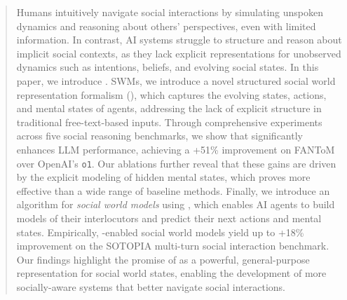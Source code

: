 \begin{abstract}
Humans intuitively navigate social interactions by simulating unspoken dynamics and reasoning about others' perspectives, even with limited information. 
In contrast, AI systems struggle to structure and reason about implicit social contexts, as they lack explicit representations for unobserved dynamics such as intentions, beliefs, and evolving social states.
In this paper, we introduce .
 SWMs, we introduce a novel structured social world representation formalism (\protocolname), which captures the evolving states, actions, and mental states of agents, addressing the lack of explicit structure in traditional free-text-based inputs.
Through comprehensive experiments across five social reasoning benchmarks, we show that \protocolname significantly enhances LLM performance, achieving a +51\% improvement on FANToM over OpenAI’s \texttt{o1}. Our ablations further reveal that these gains are driven by the explicit modeling of hidden mental states, which proves more effective than a wide range of baseline methods.
Finally, we introduce an algorithm for \textit{social world models} using \protocolname, which enables AI agents to build models of their interlocutors and predict their next actions and mental states. 
Empirically, \protocolname-enabled social world models yield up to +18\% improvement on the SOTOPIA multi-turn social interaction benchmark.
Our findings highlight the promise of \protocolname as a powerful, general-purpose representation for social world states, enabling the development of more socially-aware systems that better navigate social interactions.
\end{abstract}

